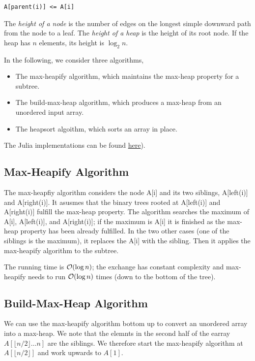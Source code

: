 \begin{verbatim}
A[parent(i)] <= A[i]
\end{verbatim}


The \emph{height of a node} is the number of edges on the longest simple downward path from the node to a leaf. The \emph{height of a heap} is the height of its root node. If the heap has $n$ elements, its height is $\log_2 n$.

In the following, we consider three algorithms,

\begin{itemize}
\item The max-heapify algorithm, which maintains the max-heap property for a subtree.
\item The build-max-heap algorithm, which produces a max-heap from an unordered input array.
\item The heapsort algoithm, which sorts an array in place.
\end{itemize}

The Julia implementations can be found \href{https://github.com/ClemensFMN/JuliaStuff/blob/master/algorithms/heapsort.jl}{here}).

\subsection{Max-Heapify Algorithm}

The max-heapfiy algorithm considers the node A[i] and its two siblings, A[left(i)] and A[right(i)]. It asusmes that the binary trees rooted at A[left(i)] and A[right(i)] fulfill the max-heap property. The algorithm searches the maximum of A[i], A[left(i)], and A[right(i)]; if the maximum is A[i] it is finished as the max-heap property has been already fulfilled. In the two other cases (one of the siblings is the maximum), it replaces the A[i] with the sibling. Then it applies the max-heapify algorithm to the subtree.

The running time is $\mathcal{O}(\log n)$; the exchange has constant complexity and max-heapify needs to run $\mathcal{O}(\log n)$ times (down to the bottom of the tree).

\subsection{Build-Max-Heap Algorithm}

We can use the max-heapify algorithm bottom up to convert an unordered array into a max-heap. We note that the elemnts in the second half of the earray $A[\lfloor n/2 \rfloor \ldots n]$ are the siblings. We therefore start the max-heapify algorithm at $A[\lfloor n/2 \rfloor]$ and work upwards to $A[1]$.



